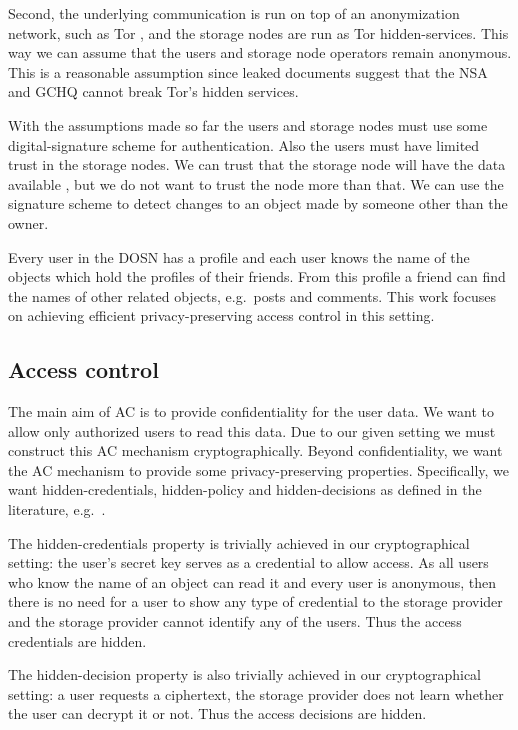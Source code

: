 Second, the underlying communication is run on top of an anonymization network, 
such as Tor \cite{tor}, and the storage nodes are run as Tor hidden-services.
This way we can assume that the users and storage node operators remain 
anonymous.
This is a reasonable assumption since leaked documents 
\cite{spiegelhiddenservices} suggest that the \ac{NSA} and \ac{GCHQ} cannot 
break Tor's hidden services.

With the assumptions made so far the users and storage nodes must use some 
digital-signature scheme for authentication.
Also the users must have limited trust in the storage nodes.
We can trust that the storage node will have the data available 
\cite{dataavailability,replicaplacement}, but we do not want to trust the node 
more than that.
We can use the signature scheme to detect changes to an object made by someone 
other than the owner.

Every user in the \ac{DOSN} has a profile and each user knows the name of the 
objects which hold the profiles of their friends.
From this profile a friend can find the names of other related objects, 
e.g.~posts and comments.
This work focuses on achieving efficient privacy-preserving access control in 
this setting.


\subsection{Access control}

The main aim of \ac{AC} is to provide confidentiality for the user data.
We want to allow only authorized users to read this data.
Due to our given setting we must construct this \ac{AC} mechanism 
cryptographically.
Beyond confidentiality, we want the \ac{AC} mechanism to provide some 
privacy-preserving properties.
Specifically, we want hidden-credentials, hidden-policy and hidden-decisions as 
defined in the literature, e.g.~\cite{ppac}.

The hidden-credentials property is trivially achieved in our cryptographical 
setting: the user's secret key serves as a credential to allow access.
As all users who know the name of an object can read it and every user is 
anonymous, then there is no need for a user to show any type of credential to 
the storage provider and the storage provider cannot identify any of the users.
Thus the access credentials are hidden.

The hidden-decision property is also trivially achieved in our cryptographical 
setting: a user requests a ciphertext, the storage provider does not learn 
whether the user can decrypt it or not.
Thus the access decisions are hidden.

